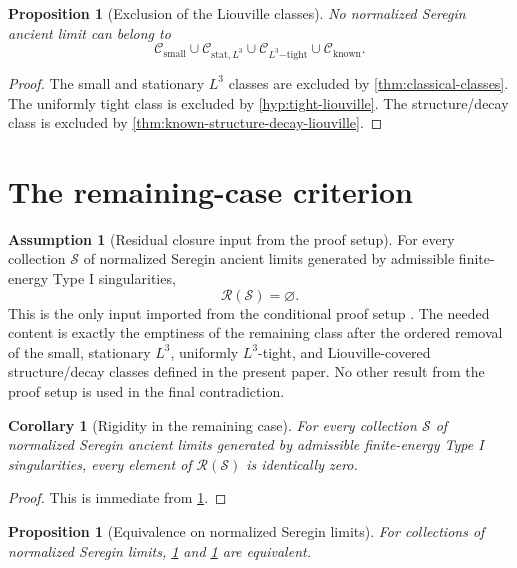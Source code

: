 \documentclass[11pt]{amsart}
\theoremstyle{plain}
\newtheorem{proposition}[theorem]{Proposition}
\newtheorem{corollary}[theorem]{Corollary}
\theoremstyle{definition}
\newtheorem{assumption}[theorem]{Assumption}
\theoremstyle{remark}
\numberwithin{equation}{section}
\newcommand{\calS}{\mathcal S}
\newcommand{\calR}{\mathcal R}
\newcommand{\calC}{\mathcal C}
\begin{document}
\begin{proposition}[Exclusion of the Liouville classes]
\label{prop:known-class-exclusion}
No normalized Seregin ancient limit can belong to
\[
   \calC_{\mathrm{small}}
   \cup
   \calC_{\mathrm{stat},L^3}
   \cup
   \calC_{L^3\mathrm{-tight}}
   \cup
   \calC_{\mathrm{known}}.
\]
\end{proposition}

\begin{proof}
The small and stationary \(L^3\) classes are excluded by
\cref{thm:classical-classes}.  The uniformly tight class is excluded by
\cref{hyp:tight-liouville}.  The structure/decay class is excluded by
\cref{thm:known-structure-decay-liouville}.
\end{proof}

\section{The remaining-case criterion}\label{sec:criterion}

\begin{assumption}[Residual closure input from the proof setup]\label{hyp:no-remainder}
For every collection \(\calS\) of normalized Seregin ancient limits generated
by admissible finite-energy Type I singularities,
\[
   \calR(\calS)=\varnothing .
\]
This is the only input imported from the conditional proof setup
\cite{ProofSetupTypeI}.  The needed content is exactly the emptiness of the
remaining class after the ordered removal of the small, stationary \(L^3\),
uniformly \(L^3\)-tight, and Liouville-covered structure/decay classes
defined in the present paper.  No other result from the proof setup is used in
the final contradiction.
\end{assumption}

\begin{corollary}[Rigidity in the remaining case]\label{hyp:remainder-rigidity}
For every collection \(\calS\) of normalized Seregin ancient limits generated
by admissible finite-energy Type I singularities, every element of
\(\calR(\calS)\) is identically zero.
\end{corollary}

\begin{proof}
This is immediate from \cref{hyp:no-remainder}.
\end{proof}

\begin{proposition}[Equivalence on normalized Seregin limits]
\label{prop:remainder-equivalence}
For collections of normalized Seregin limits, \cref{hyp:no-remainder} and
\cref{hyp:remainder-rigidity} are equivalent.
\end{proposition}
\end{document}
